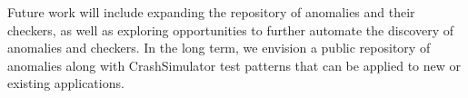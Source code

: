 Future work will include expanding the repository of anomalies and their
checkers, as well as exploring opportunities to further automate the discovery
of anomalies and checkers.  In the long term, we envision a public repository of
anomalies along with CrashSimulator test patterns that can be applied to new or
existing applications.
